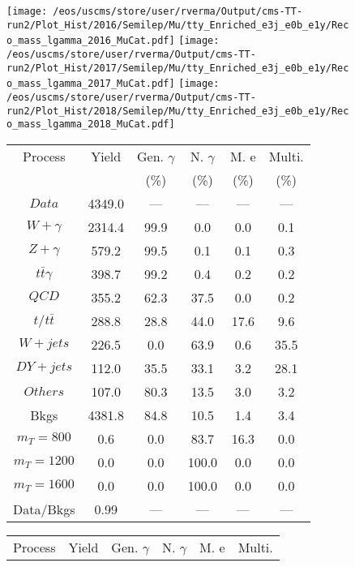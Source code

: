 \begin{figure}
\centering
\texttt{[image: /eos/uscms/store/user/rverma/Output/cms-TT-run2/Plot\_Hist/2016/Semilep/Mu/tty\_Enriched\_e3j\_e0b\_e1y/Reco\_mass\_lgamma\_2016\_MuCat.pdf]}
\texttt{[image: /eos/uscms/store/user/rverma/Output/cms-TT-run2/Plot\_Hist/2017/Semilep/Mu/tty\_Enriched\_e3j\_e0b\_e1y/Reco\_mass\_lgamma\_2017\_MuCat.pdf]}
\texttt{[image: /eos/uscms/store/user/rverma/Output/cms-TT-run2/Plot\_Hist/2018/Semilep/Mu/tty\_Enriched\_e3j\_e0b\_e1y/Reco\_mass\_lgamma\_2018\_MuCat.pdf]}
\begin{minipage}[c]{0.32\textwidth}
\centering
\tiny{
\begin{tabular}{cccccc}
\hline
Process & Yield & Gen. $\gamma$ & N. $\gamma$ & M. e & Multi. \\
 &  & (\%) & (\%) & (\%) & (\%)  \\
\hline
                                                                      $ Data $ &  4349.0 &  --- &  --- &  --- &  ---\\
$ W+\gamma $ &  2314.4 &  99.9 &  0.0 &  0.0 &  0.1\\
$ Z+\gamma $ &  579.2 &  99.5 &  0.1 &  0.1 &  0.3\\
$ t\bar{t}\gamma $ &  398.7 &  99.2 &  0.4 &  0.2 &  0.2\\
$ QCD $ &  355.2 &  62.3 &  37.5 &  0.0 &  0.2\\
$ t/t\bar{t} $ &  288.8 &  28.8 &  44.0 &  17.6 &  9.6\\
$ W+jets $ &  226.5 &  0.0 &  63.9 &  0.6 &  35.5\\
$ DY+jets $ &  112.0 &  35.5 &  33.1 &  3.2 &  28.1\\
$ Others $ &  107.0 &  80.3 &  13.5 &  3.0 &  3.2\\
Bkgs &  4381.8 &  84.8 &  10.5 &  1.4 &  3.4\\
$ m_{T} = 800 $ &  0.6 &  0.0 &  83.7 &  16.3 &  0.0\\
$ m_{T} = 1200 $ &  0.0 &  0.0 &  100.0 &  0.0 &  0.0\\
$ m_{T} = 1600 $ &  0.0 &  0.0 &  100.0 &  0.0 &  0.0\\
Data/Bkgs &  0.99 &  --- &  --- &  --- &  ---\\
\hline
\end{tabular}
}
\end{minipage}
\begin{minipage}[c]{0.32\textwidth}
\centering
\tiny{
\begin{tabular}{cccccc}
\hline
Process & Yield & Gen. $\gamma$ & N. $\gamma$ & M. e & Multi. \\

\end{tabular}}
\end{minipage}
\end{figure}
